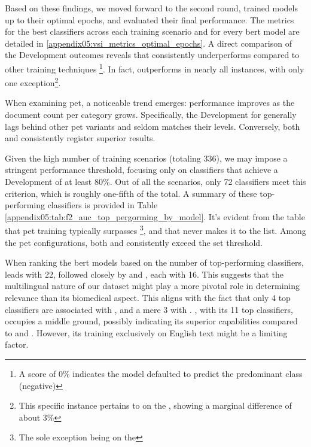 Based on these findings, we moved forward to the second round, trained models up to their optimal epochs, and evaluated their final performance.
The metrics for the best classifiers across each training scenario and for every \gls{bert} model are detailed in \appendixname{} \ref{appendix05:vsi_metrics_optimal_epochs}. 
A direct comparison of the Development \fTwo{} outcomes reveals that \unbalanced{} consistently underperforms compared to other training techniques
\footnote{A \fTwo{} score of 0\% indicates the model defaulted to predict the predominant class (negative)}.
In fact, \balanced{} outperforms \unbalanced{} in nearly all instances, with only one exception\footnote{This specific instance pertains to \bertbase{} on the \trafilaturaTitle{}, showing a marginal difference of about 3\%}.

When examining \gls{pet}, a noticeable trend emerges: performance improves as the document count per category grows. Specifically, the Development \fTwo{} for \petFifty{} generally lags behind other \gls{pet} variants and seldom matches their levels. Conversely, both \petFiveHundred{} and \petThousand{} consistently register superior results.


Given the high number of training scenarios (totaling $336$), we may impose a stringent performance threshold, focusing only on classifiers that achieve a Development \fTwo{} of at least 80\%. 
Out of all the scenarios, only 72 classifiers meet this criterion, which is roughly one-fifth of the total.
A summary of these top-performing classifiers is provided in Table \ref{appendix05:tab:f2_auc_top_pergorming_by_model}. It's evident from the table that \gls{pet} training typically surpasses \finetuning{}\footnote{The sole exception being \bertxlmroberta{} on the \trafilaturaFulltext{}}, and that 
\unbalanced{} never makes it to the list. 
Among the \gls{pet} configurations, both \petFiveHundred{} and \petThousand{} consistently exceed the set threshold.


When ranking the \gls{bert} models based on the number of top-performing classifiers, \bertxlmroberta{} leads with 22, followed closely by \bertmultilingual{} and \bertbiolinkbert{}, each with 16. 
This suggests that the multilingual nature of our dataset might play a more pivotal role in determining relevance than its biomedical aspect. 
This aligns with the fact that only 4 top classifiers are associated with \bertscibert{}, and a mere 3 with \bertbase{}. 
\bertroberta{}, with its 11 top classifiers, occupies a middle ground, possibly indicating its superior capabilities compared to \bertbase{} and \bertscibert{}. However, its training exclusively on English text might be a limiting factor.

